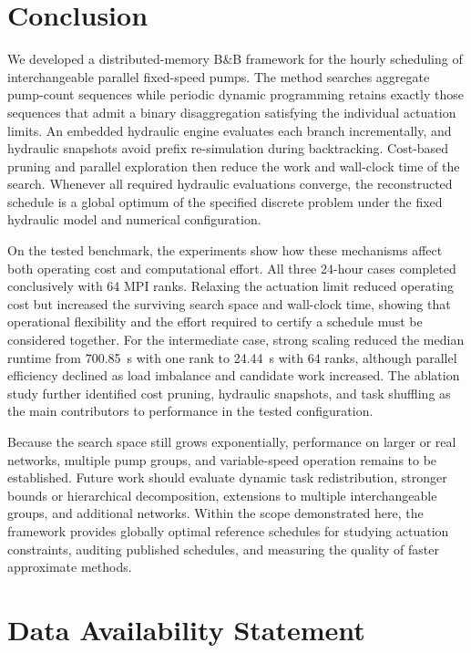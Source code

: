 \documentclass[Journal,letterpaper,InsideFigs]{ascelike-new}
\begin{document}
\section{Conclusion}
\label{sec:conclusion}

We developed a distributed-memory B\&B framework for the hourly scheduling of interchangeable parallel fixed-speed pumps. The method searches aggregate pump-count sequences while periodic dynamic programming retains exactly those sequences that admit a binary disaggregation satisfying the individual actuation limits. An embedded hydraulic engine evaluates each branch incrementally, and hydraulic snapshots avoid prefix re-simulation during backtracking. Cost-based pruning and parallel exploration then reduce the work and wall-clock time of the search. Whenever all required hydraulic evaluations converge, the reconstructed schedule is a global optimum of the specified discrete problem under the fixed hydraulic model and numerical configuration.

On the tested benchmark, the experiments show how these mechanisms affect both operating cost and computational effort. All three 24-hour cases completed conclusively with 64 MPI ranks. Relaxing the actuation limit reduced operating cost but increased the surviving search space and wall-clock time, showing that operational flexibility and the effort required to certify a schedule must be considered together. For the intermediate case, strong scaling reduced the median runtime from 700.85~s with one rank to 24.44~s with 64 ranks, although parallel efficiency declined as load imbalance and candidate work increased. The ablation study further identified cost pruning, hydraulic snapshots, and task shuffling as the main contributors to performance in the tested configuration.

Because the search space still grows exponentially, performance on larger or real networks, multiple pump groups, and variable-speed operation remains to be established. Future work should evaluate dynamic task redistribution, stronger bounds or hierarchical decomposition, extensions to multiple interchangeable groups, and additional networks. Within the scope demonstrated here, the framework provides globally optimal reference schedules for studying actuation constraints, auditing published schedules, and measuring the quality of faster approximate methods.

\section*{Data Availability Statement}
\end{document}

